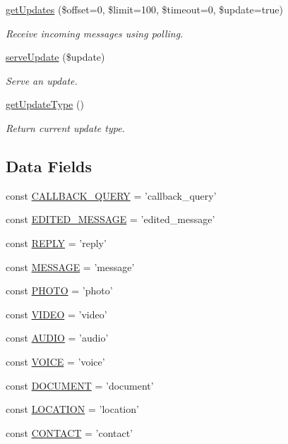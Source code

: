 \begin{DoxyCompactItemize}
\hyperlink{class_telegram_adb467486d3d5e83ce21a03e00f17b16c}{get\-Updates} (\$offset=0, \$limit=100, \$timeout=0, \$update=true)
\begin{DoxyCompactList}\small\item\em Receive incoming messages using polling. \end{DoxyCompactList}\item 
\hyperlink{class_telegram_a57e6066940e4cca7310cfd5c45fd8510}{serve\-Update} (\$update)
\begin{DoxyCompactList}\small\item\em Serve an update. \end{DoxyCompactList}\item 
\hyperlink{class_telegram_a291f955d4bae8e89b42e0a762b9bcc33}{get\-Update\-Type} ()
\begin{DoxyCompactList}\small\item\em Return current update type. \end{DoxyCompactList}\end{DoxyCompactItemize}
\subsection*{Data Fields}
\begin{DoxyCompactItemize}
\item 
const \hyperlink{class_telegram_a464a4a095bb928388381b33e0babf9fe}{C\-A\-L\-L\-B\-A\-C\-K\-\_\-\-Q\-U\-E\-R\-Y} = 'callback\-\_\-query'
\item 
const \hyperlink{class_telegram_aa469cc007db1409d59a5e5bfac0633ec}{E\-D\-I\-T\-E\-D\-\_\-\-M\-E\-S\-S\-A\-G\-E} = 'edited\-\_\-message'
\item 
const \hyperlink{class_telegram_acb63774895b195d4c22afe2b089a3ddd}{R\-E\-P\-L\-Y} = 'reply'
\item 
const \hyperlink{class_telegram_af9b451d04eb24044a2d4112be10de570}{M\-E\-S\-S\-A\-G\-E} = 'message'
\item 
const \hyperlink{class_telegram_a0aeb08e94e66f9d958f565530b6b6a80}{P\-H\-O\-T\-O} = 'photo'
\item 
const \hyperlink{class_telegram_a333a9b0a1034beea1b4b505f30885cea}{V\-I\-D\-E\-O} = 'video'
\item 
const \hyperlink{class_telegram_a9f6cfe013372d7de1568a95c871214d1}{A\-U\-D\-I\-O} = 'audio'
\item 
const \hyperlink{class_telegram_a12e48e3d10ee66d0a6ca34c207d8e282}{V\-O\-I\-C\-E} = 'voice'
\item 
const \hyperlink{class_telegram_a6494d627239bf203e03297843bf52053}{D\-O\-C\-U\-M\-E\-N\-T} = 'document'
\item 
const \hyperlink{class_telegram_aca699735a6cec340e45cde5c623bdb32}{L\-O\-C\-A\-T\-I\-O\-N} = 'location'
\item 
const \hyperlink{class_telegram_aac7f4f1b55319f64ad56ae8a8222d9b5}{C\-O\-N\-T\-A\-C\-T} = 'contact'
\end{DoxyCompactItemize}



